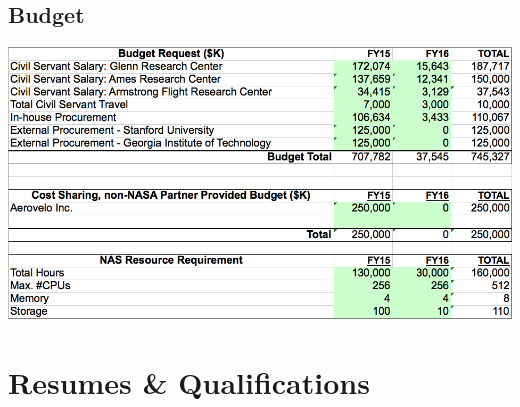 \documentclass[]{aiaa-tc}
\begin{document}
  \begin{landscape}
  \section{Budget}
    \centering
    \includegraphics[height=\textheight]{images/budget_request}
    \end{landscape}

  \clearpage
  \section{Resumes \& Qualifications}

    \clearpage
    
    \restoregeometry
    
    \restoregeometry
\end{document}
